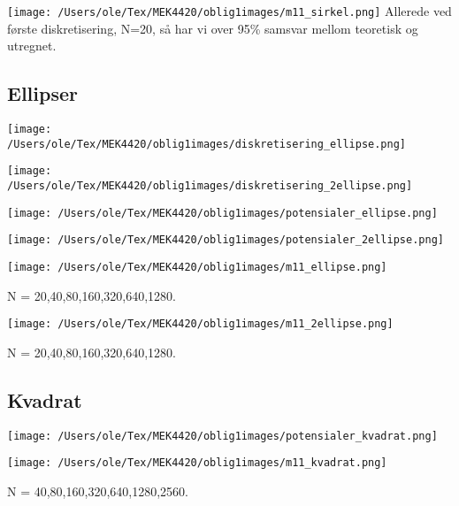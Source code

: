 \documentclass{beamer}
\begin{document}
\begin{frame}
{\texttt{[image: /Users/ole/Tex/MEK4420/oblig1images/m11\_sirkel.png]}}
Allerede ved første diskretisering, N=20, så har vi over 95\% samsvar mellom teoretisk og utregnet. 
\end{frame}

\subsection{Ellipser}
\begin{frame}
\texttt{[image: /Users/ole/Tex/MEK4420/oblig1images/diskretisering\_ellipse.png]}
\end{frame}

\begin{frame}
\texttt{[image: /Users/ole/Tex/MEK4420/oblig1images/diskretisering\_2ellipse.png]}
\end{frame}

\begin{frame}
\texttt{[image: /Users/ole/Tex/MEK4420/oblig1images/potensialer\_ellipse.png]}
\end{frame}

\begin{frame}
\texttt{[image: /Users/ole/Tex/MEK4420/oblig1images/potensialer\_2ellipse.png]}
\end{frame}

\begin{frame}
\texttt{[image: /Users/ole/Tex/MEK4420/oblig1images/m11\_ellipse.png]}

N = 20,40,80,160,320,640,1280. 
\end{frame}

\begin{frame}
\texttt{[image: /Users/ole/Tex/MEK4420/oblig1images/m11\_2ellipse.png]}

N = 20,40,80,160,320,640,1280.
\end{frame}




\subsection{Kvadrat}
\begin{frame}
\texttt{[image: /Users/ole/Tex/MEK4420/oblig1images/potensialer\_kvadrat.png]}
\end{frame}
\begin{frame}
\texttt{[image: /Users/ole/Tex/MEK4420/oblig1images/m11\_kvadrat.png]}
 
N = 40,80,160,320,640,1280,2560.
\end{frame}
\end{document}
